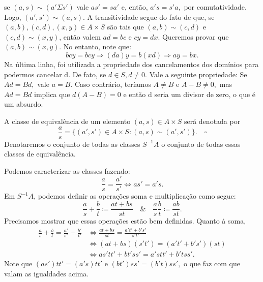 \documentclass[AlgebraII/algebraII_notes.tex]{subfiles}
\begin{document}
se \((a, s)\sim (a'\Sigma s')\) vale \(as' = sa'\) e, então, \(a's = s'a, \) por comutatividade.
Logo, \((a', s')\sim (a, s).\) A transitividade segue do fato de que, se \((a, b), (c, d), (x, y)\in A\times S\) são
tais que \((a, b)\sim (c, d)\) e \((c, d)\sim (x, y)\), então valem \(ad = bc\) e \(cy = dx.\) Queremos provar
que \((a, b)\sim (x, y)\). No entanto, note que:
\[
	bcy = bcy \Rightarrow (da)y = b(xd) \Rightarrow ay = bx.
\]
Na última linha, foi utilizada a propriedade dos cancelamentos dos domínios para podermos cancelar d. De fato, se \(d\in S, d\neq 0.\)
Vale a seguinte propriedade: Se \(Ad = Bd,\) vale \(a = B.\) Caso contrário, teríamos \(A\neq B\) e \(A - B\neq 0,\) mas \(Ad = Bd\) implica que
\(d(A-B) = 0\) e então d seria um divisor de zero, o que é um absurdo.

\begin{def*}
	A classe de equivalência de um elemento \((a, s)\in A\times S\) será denotada por
	\[
		\frac{a}{s} = \{(a', s')\in A\times S: (a, s)\sim (a', s')\}.\quad\square
	\]
	Denotaremos o conjunto de todas as classes \(S^{-1}A\) o conjunto de todas essas classes de equivalência.
\end{def*}
Podemos caracterizar as classes fazendo:
\[
	\frac{a}{s} = \frac{a'}{s'} \Longleftrightarrow as'=a's.
\]
Em \(S^{-1}A\), podemos definir as operações soma e multiplicação como segue:
\[
	\frac{a}{s}+\frac{b}{t}\coloneqq \frac{at+bs}{st}\quad\&\quad \frac{a}{s}\frac{b}{t}\coloneqq \frac{ab}{st}.
\]
Precisamos mostrar que essas operações estão bem definidas. Quanto à soma,
\begin{align*}
	\frac{a}{s} + \frac{b}{t} = \frac{a'}{s'} + \frac{b'}{t'} & \Longleftrightarrow \frac{at+bs}{st} = \frac{a't' + b's'}{s't'} \\
	                                                          & \Longleftrightarrow (at+bs)(s't') = (a't'+b's')(st)             \\
	                                                          & \Longleftrightarrow as't t'+bt'ss' = a'st t' + b'tss'.
\end{align*}
Note que \((as')t t' = (a's)t t'\) e \((bt')ss' = (b't)ss',\) o que faz com que valam as igualdades acima.
\end{document}
